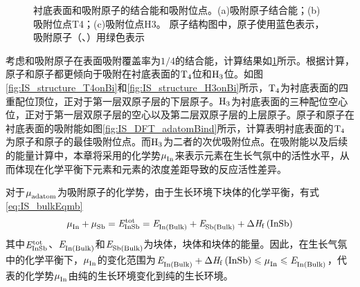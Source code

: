 \begin{figure}[!b]
{    }
    \caption{衬底表面和吸附原子的结合能和吸附位点。(a)吸附原子结合能；(b)吸附位点T4；(c)吸附位点H3。 原子结构图中，原子使用蓝色表示，吸附原子（、）用绿色表示}
    \label{fig:IS_Bi_adatoms}
\end{figure}

考虑和吸附原子在表面吸附覆盖率为$1/ 4$的结合能，计算结果如\ref{fig:IS_Bi_adatoms}所示。根据计算，原子和原子都更倾向于吸附在衬底表面的$\rm T_{4} \it$位和$\rm H_{3} \it$位。如图\ref{fig:IS_structure_T4onBi}和\ref{fig:IS_structure_H3onBi}所示，$\rm T_{4} \it$为衬底表面的四重配位顶位，正对于第一层双原子层的下层原子。$\rm H_{3} \it$为衬底表面的三种配位空心位，正对于第一层双原子层的空心以及第二层双原子层的上层原子。原子和原子在衬底表面的吸附能如图\ref{fig:IS_DFT_adatomBind}所示，计算表明衬底表面的$\rm T_{4} \it$为原子和原子的最佳吸附位点。而$\rm H_{3} \it$为二者的次优吸附位点。在吸附能以及后续的能量计算中，本章将采用的化学势$\it \mu_{\rm In}^{\rm } \it$来表示元素在生长气氛中的活性水平，从而体现在化学平衡下元素和元素的浓度差距导致的反应活性差异。

对于$\it \mu_{\rm adatom}^{\rm } \it$为吸附原子的化学势，由于生长环境下块体的化学平衡，有式\eqref{eq:IS_bulkEqmb}\chinesecolon
\begin{equation}
    \label{eq:IS_bulkEqmb}
    \muVar{In}{}+\muVar{Sb}{}=\energyVar{InSb}{tot}=\energyVar{In\left(Bulk\right)}{}+\energyVar{Sb\left(Bulk\right)}{}+\rm{\Delta} \it H_{\rm f}\left(\ce{InSb}\right)
\end{equation}
其中$\it E_{\rm InSb}^{\rm tot} \it$、$\it E_{\rm In\left(Bulk\right)}^{\rm } \it$和$\it E_{\rm Sb\left(Bulk\right)}^{\rm } \it$为块体，块体和块体的能量。因此，在生长气氛中的化学平衡下，$\it \mu_{\rm In}^{\rm } \it$的变化范围为$ \energyVar{In\left(Bulk\right)}{}+\rm{\Delta} \it H_{\rm f}\left(\ce{InSb}\right) \leqslant \muVar{In}{} \leqslant \energyVar{In\left(Bulk\right)}{}$，代表的化学势$\it \mu_{\rm In}^{\rm } \it$由纯的生长环境变化到纯的生长环境。


